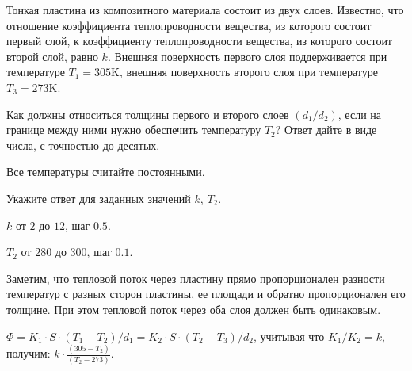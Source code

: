 
Тонкая пластина из композитного материала состоит из двух слоев. 
Известно, что отношение коэффициента теплопроводности вещества, из которого состоит первый слой, 
к коэффициенту теплопроводности вещества, из которого состоит второй слой, равно $k$. 
Внешняя поверхность первого слоя поддерживается при температуре \linebreak $T_1 = 305$K, внешняя поверхность 
второго слоя при температуре $T_3 = 273$K. 

Как должны относиться толщины первого и второго слоев $(d_1 / d_2)$, если на границе между ними нужно 
обеспечить температуру $T_2$? Ответ дайте в виде числа, с точностью до десятых. 

Все температуры считайте постоянными.

Укажите ответ для заданных значений $k$, $T_2$.

\paramSection

$k$ от $2$ до $12$, шаг $0.5$.

$T_2$ от $280$ до $300$, шаг $0.1$.

\solutionSection

Заметим, что тепловой поток через пластину прямо пропорционален разности температур с разных сторон пластины, 
ее площади и обратно пропорционален его толщине. При этом тепловой поток через оба слоя должен быть одинаковым.

$\Phi= K_1 \cdot S \cdot (T_1-T_2)/d_1 = K_2 \cdot S \cdot (T_2-T_3)/d_2$, учитывая что $K_1/ K_2 = k$, получим: $k \cdot \frac{(305-T_2)}{(T_2-273)}$.

